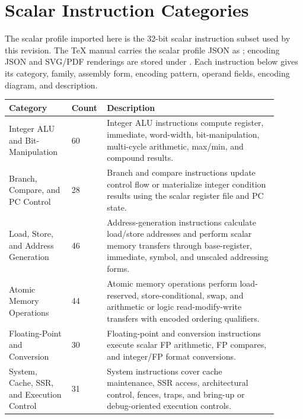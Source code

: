\section{Scalar Instruction Categories}
The scalar profile imported here is the 32-bit scalar instruction subset used by this revision. The TeX manual carries the scalar profile JSON as ; encoding JSON and SVG/PDF renderings are stored under . Each instruction below gives its category, family, assembly form, encoding pattern, operand fields, encoding diagram, and description.
\begin{longtable}{@{}L{0.22\linewidth}R{0.08\linewidth}L{0.60\linewidth}@{}}
\toprule
Category & Count & Description \\
\midrule
Integer ALU and Bit-Manipulation & 60 & Integer ALU instructions compute register, immediate, word-width, bit-manipulation, multi-cycle arithmetic, max/min, and compound results. \\
Branch, Compare, and PC Control & 28 & Branch and compare instructions update control flow or materialize integer condition results using the scalar register file and PC state. \\
Load, Store, and Address Generation & 46 & Address-generation instructions calculate load/store addresses and perform scalar memory transfers through base-register, immediate, symbol, and unscaled addressing forms. \\
Atomic Memory Operations & 44 & Atomic memory operations perform load-reserved, store-conditional, swap, and arithmetic or logic read-modify-write transfers with encoded ordering qualifiers. \\
Floating-Point and Conversion & 30 & Floating-point and conversion instructions execute scalar FP arithmetic, FP compares, and integer/FP format conversions. \\
System, Cache, SSR, and Execution Control & 31 & System instructions cover cache maintenance, SSR access, architectural control, fences, traps, and bring-up or debug-oriented execution controls. \\
\bottomrule
\end{longtable}

